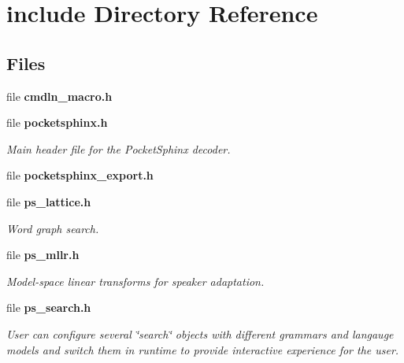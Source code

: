 \section{include Directory Reference}
\label{dir_d44c64559bbebec7f509842c48db8b23}
\subsection*{Files}
\begin{DoxyCompactItemize}
\item 
file {\bfseries cmdln\-\_\-macro.\-h}
\item 
file {\bf pocketsphinx.\-h}
\begin{DoxyCompactList}\small\item\em Main header file for the Pocket\-Sphinx decoder. \end{DoxyCompactList}\item 
file {\bfseries pocketsphinx\-\_\-export.\-h}
\item 
file {\bf ps\-\_\-lattice.\-h}
\begin{DoxyCompactList}\small\item\em Word graph search. \end{DoxyCompactList}\item 
file {\bf ps\-\_\-mllr.\-h}
\begin{DoxyCompactList}\small\item\em Model-\/space linear transforms for speaker adaptation. \end{DoxyCompactList}\item 
file {\bf ps\-\_\-search.\-h}
\begin{DoxyCompactList}\small\item\em User can configure several \char`\"{}search\char`\"{} objects with different grammars and langauge models and switch them in runtime to provide interactive experience for the user. \end{DoxyCompactList}\end{DoxyCompactItemize}

